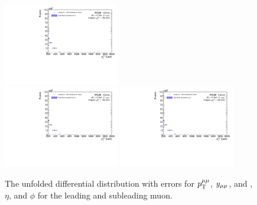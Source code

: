 \begin{figure}[h!]
  \includegraphics[page=216,width=0.45\textwidth]{figures/unfoldErrPlots.pdf} \\
  \includegraphics[page=244,width=0.45\textwidth]{figures/unfoldErrPlots.pdf}
  \includegraphics[page=272,width=0.45\textwidth]{figures/unfoldErrPlots.pdf}
  \caption{The unfolded differential distribution with errors for $p_\mathrm{T}^{\mu\mu}$, $y_{\mu\mu}$, and \pt, $\eta$, and $\phi$ for the leading and subleading muon.}
  \label{fig:unfoldErr1}
\end{figure}

